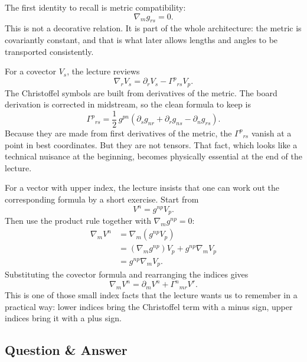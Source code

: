 The first identity to recall is metric compatibility:
\begin{equation}
\nabla_m g_{rs}=0.
\end{equation}
This is not a decorative relation. It is part of the whole architecture: the metric is covariantly constant, and that is what later allows lengths and angles to be transported consistently.

For a covector \(V_s\), the lecture reviews
\begin{equation}
\nabla_r V_s=\partial_r V_s-\Gamma^{p}{}_{rs}V_p.
\end{equation}
The Christoffel symbols are built from derivatives of the metric. The board derivation is corrected in midstream, so the clean formula to keep is
\begin{equation}
\Gamma^{p}{}_{rs}
=
\frac{1}{2}\,
g^{pn}
\left(
\partial_s g_{nr}
+
\partial_r g_{ns}
-
\partial_n g_{rs}
\right).
\end{equation}
Because they are made from first derivatives of the metric, the \(\Gamma^{p}{}_{rs}\) vanish at a point in best coordinates. But they are not tensors. That fact, which looks like a technical nuisance at the beginning, becomes physically essential at the end of the lecture.

For a vector with upper index, the lecture insists that one can work out the corresponding formula by a short exercise. Start from
\begin{equation}
V^n=g^{np}V_p.
\end{equation}
Then use the product rule together with \(\nabla_m g^{np}=0\):
\begin{align}
\nabla_m V^n
&=
\nabla_m(g^{np}V_p) \\
&=
(\nabla_m g^{np})V_p+g^{np}\nabla_m V_p \\
&=
g^{np}\nabla_m V_p.
\end{align}
Substituting the covector formula and rearranging the indices gives
\begin{equation}
\nabla_m V^n=\partial_m V^n+\Gamma^{n}{}_{mr}V^r.
\end{equation}
This is one of those small index facts that the lecture wants us to remember in a practical way: lower indices bring the Christoffel term with a minus sign, upper indices bring it with a plus sign.

\subsection{Question \& Answer}

